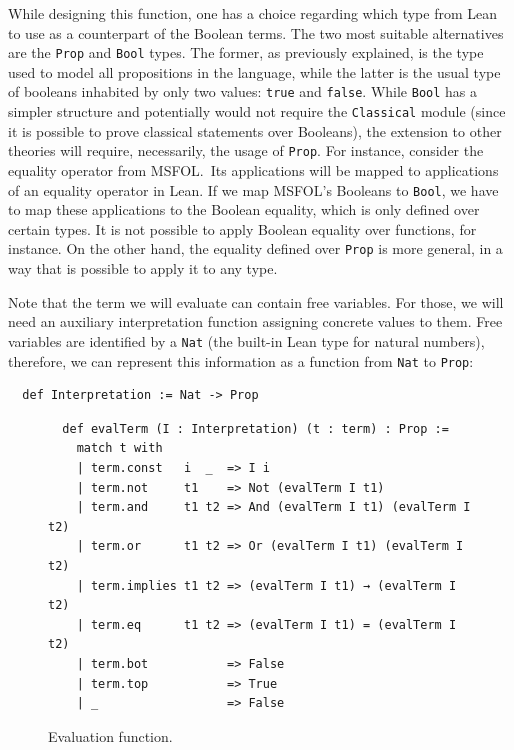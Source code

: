 While designing this function, one has a
choice regarding which type from Lean to use as a counterpart of the Boolean terms. The two
most suitable alternatives are the \texttt{Prop} and \texttt{Bool} types. The former, as
previously explained, is the type used to model all propositions in the language, while
the latter is the usual type of booleans inhabited by only two values: \texttt{true} and
\texttt{false}. While \texttt{Bool} has a simpler structure and potentially would not
require the \texttt{Classical} module (since it is possible to prove classical statements over Booleans),
the extension to other theories will require, necessarily, the usage of \texttt{Prop}. For instance,
consider the equality operator from MSFOL.\ Its applications will be mapped to applications of an equality operator
in Lean. If we map MSFOL's Booleans to \texttt{Bool}, we have to map these applications to the
Boolean equality, which is only defined over certain types. It is not possible
to apply Boolean equality over functions, for instance. On the other hand, the equality
defined over \texttt{Prop} is more general, in a way that is possible to apply it to any type.

Note that the term we will evaluate can contain free variables. For those, we will need an auxiliary interpretation function assigning concrete values to them.
Free variables are
identified by a \texttt{Nat} (the built-in Lean type for natural numbers), therefore, we can
represent this information as a function from \texttt{Nat} to
\texttt{Prop}:

\begin{verbatim}
  def Interpretation := Nat -> Prop
\end{verbatim}


\begin{figure}[t]
\begin{verbatim}
  def evalTerm (I : Interpretation) (t : term) : Prop :=
    match t with
    | term.const   i  _  => I i
    | term.not     t1    => Not (evalTerm I t1)
    | term.and     t1 t2 => And (evalTerm I t1) (evalTerm I t2)
    | term.or      t1 t2 => Or (evalTerm I t1) (evalTerm I t2)
    | term.implies t1 t2 => (evalTerm I t1) → (evalTerm I t2)
    | term.eq      t1 t2 => (evalTerm I t1) = (evalTerm I t2)
    | term.bot           => False
    | term.top           => True
    | _                  => False
\end{verbatim}
\caption{Evaluation function.}\label{evalTerm1}
\end{figure}

